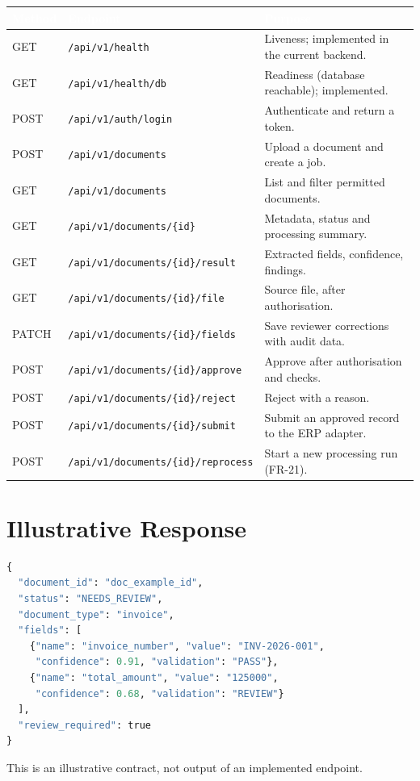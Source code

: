 \documentclass[11pt,a4paper]{report}
\newcommand{\hdr}[1]{\textcolor{white}{\sffamily\bfseries #1}}
\newcommand{\tblstart}{\rowcolors{2}{white}{rowgray}\arrayrulecolor{teal!60}}
\newcommand{\hdrrow}{\rowcolor{navy}}
\begin{document}
{\tblstart\small
\begin{longtable}{L{1.7cm}L{6.0cm}L{6.1cm}}
\hdrrow \hdr{Method} & \hdr{Endpoint} & \hdr{Purpose}\\ \endhead
GET & \texttt{/api/v1/health} & Liveness; implemented in the current backend.\\
GET & \texttt{/api/v1/health/db} & Readiness (database reachable); implemented.\\
POST & \texttt{/api/v1/auth/login} & Authenticate and return a token.\\
POST & \texttt{/api/v1/documents} & Upload a document and create a job.\\
GET & \texttt{/api/v1/documents} & List and filter permitted documents.\\
GET & \texttt{/api/v1/documents/\{id\}} & Metadata, status and processing summary.\\
GET & \texttt{/api/v1/documents/\{id\}/result} & Extracted fields, confidence, findings.\\
GET & \texttt{/api/v1/documents/\{id\}/file} & Source file, after authorisation.\\
PATCH & \texttt{/api/v1/documents/\{id\}/fields} & Save reviewer corrections with audit data.\\
POST & \texttt{/api/v1/documents/\{id\}/approve} & Approve after authorisation and checks.\\
POST & \texttt{/api/v1/documents/\{id\}/reject} & Reject with a reason.\\
POST & \texttt{/api/v1/documents/\{id\}/submit} & Submit an approved record to the ERP adapter.\\
POST & \texttt{/api/v1/documents/\{id\}/reprocess} & Start a new processing run (FR-21).\\
\hline
\end{longtable}}

\section{Illustrative Response}
\begin{lstlisting}[language=Python,morekeywords={true,false}]
{
  "document_id": "doc_example_id",
  "status": "NEEDS_REVIEW",
  "document_type": "invoice",
  "fields": [
    {"name": "invoice_number", "value": "INV-2026-001",
     "confidence": 0.91, "validation": "PASS"},
    {"name": "total_amount", "value": "125000",
     "confidence": 0.68, "validation": "REVIEW"}
  ],
  "review_required": true
}
\end{lstlisting}
This is an illustrative contract, not output of an implemented endpoint.
\end{document}
